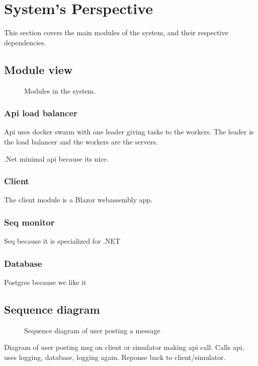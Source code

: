 \section{System's Perspective}
\label{ch:sys_persp} %

This section covers the main modules of the system, 
and their respective dependencies.

\subsection{Module view}



\begin{figure}[H]
    \centering
    \caption{Modules in the system.}
    \label{fig:modules}
\end{figure}

\subsubsection{Api load balancer}

Api uses docker swarm with one leader giving tasks 
to the workers. The leader is the load balancer 
and the workers are the servers. 

.Net minimal api because its nice.

\subsubsection{Client}

The client module is a Blazor webassembly app.

\subsubsection{Seq monitor}

Seq\cite{seq} because it is specialized for .NET

\subsubsection{Database}

Postgres because we like it


\subsection{Sequence diagram}
\begin{figure}[H]
    \centering
    
    \caption{Sequence diagram of user posting a message}
    \label{fig:seq_diagram}
\end{figure}

Diagram of user posting msg on client or simulator making api call. 
Calls api, uses logging, database, logging again. Reponse back to client/simulator.

\begin{figure}[H]
    \centering
    \caption{}
    \label{fig:sequence_diagram}
\end{figure}
